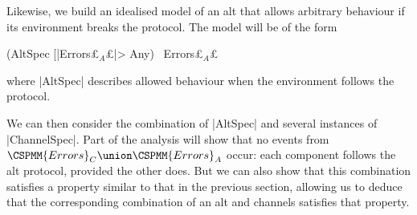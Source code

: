 Likewise, we build an idealised model of an alt that allows arbitrary
behaviour if its environment breaks the protocol.  The model will be of the
form 
%
\begin{cspm}
(AltSpec [|Errors£$_A$£|> Any) \ Errors£$_A$£
\end{cspm}
%
where |AltSpec| describes allowed behaviour when the environment follows the
protocol.  

We can then consider the combination of |AltSpec| and several instances of
|ChannelSpec|.  Part of the analysis will show that no events from
$\CSPMM{Errors}_C \union \CSPMM{Errors}_A$ occur: each component follows the
alt protocol, provided the other does.  But we can also show that this
combination satisfies a property similar to that in the previous section,
allowing us to deduce that the corresponding combination of an alt and
channels satisfies that property. 

